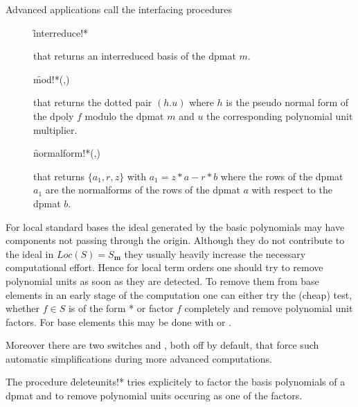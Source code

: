 Advanced applications call the interfacing procedures
\begin{description}

\item[]
  \begin{syntax}
    \f{interreduce!*} 
  \end{syntax}
  \hypertarget{procedure:INTERREDUCE!*(}{}
that returns an interreduced basis of the dpmat $m$.

\item[]
  \begin{syntax}
    \f{mod!*}(,)
  \end{syntax}
  \hypertarget{procedure:MOD!*}{}
that returns the dotted pair $(h.u)$ where $h$ is the pseudo
normal form of the dpoly $f$ modulo the dpmat $m$ and $u$ the
corresponding polynomial unit multiplier.

\item[]
  \begin{syntax}
    \f{normalform!*}(,)
  \end{syntax}
  \hypertarget{procedure:NORMALFORM!*}{}
that returns $\{a_1,r,z\}$ with $a_1=z*a-r*b$ where the rows of
the dpmat $a_1$ are the normalforms of the rows of the dpmat $a$ with
respect to the dpmat $b$.
\end{description}

For local standard bases the ideal generated by the basic polynomials
may have components not passing through the origin. Although they do
not contribute to the ideal in $Loc(S)=S_{\mathbf{m}}$ they usually heavily
increase the necessary computational effort. Hence for local term
orders one should try to remove polynomial units as soon as they
are detected. To remove them from base elements in an early stage of
the computation one can either try the (cheap) test, whether $f\in S$
is of the form  *   or factor $f$ completely and remove polynomial unit
factors. For base elements this may be done with
 or .

Moreover there are two switches  and
, both off by default, that force such automatic
simplifications during more advanced computations.

The procedure \f{deleteunits!*} tries explicitely to factor the
basis polynomials of a dpmat and to remove polynomial units occuring
as one of the factors.

